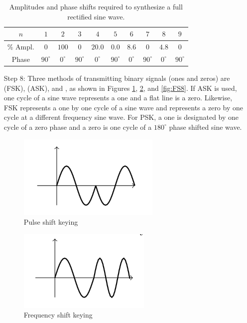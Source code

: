\documentclass[12pt, a4paper, oneside, openright, titlepage]{book}
\begin{document}
\begin{itemize}[leftmargin = 50pt]
        \begin{table}[H]
            \centering 
            \caption{Amplitudes and phase shifts required to synthesize a full rectified sine wave.}
            \begin{tabular}{|c|c|c|c|c|c|c|c|c|c|}
                \hline
                $n$ & $1$ & $2$ & $3$ & $4$ & $5$ & $6$ & $7$ & $8$ & $9$ \\ \hline
                \% Ampl. & $0$ & $100 $& $0$ & $20.0$ & $0.0$ & $8.6$ & $0$ & $4.8$ & $0$ \\ 
                Phase & $90^{\circ}$ & $0^{\circ}$ & $90^{\circ}$ & $0^{\circ}$ & $90^{\circ}$ & $0^{\circ}$ & $90^{\circ}$ & $0^{\circ}$ & $90^{\circ}$ \\ \hline
            \end{tabular}
            \label{tab:FS5}
        \end{table}
    \item[Step 8:] Three methods of transmitting binary signals (ones and zeros) are  (FSK),  (ASK), and , as shown in Figures \ref{fig:FS6}, \ref{fig:FS7}, and \ref{fig:FS8}. If ASK is used, one cycle of a sine wave represents a one and a flat line is a zero. Likewise, FSK represents a one by one cycle of a sine wave and represents a zero by one cycle at a different frequency sine wave. For PSK, a one is designated by one cycle of a zero phase and a zero is one cycle of a $180^{\circ}$ phase shifted sine wave.

        \begin{figure}[H]
    \centering
    \includegraphics[scale = 0.8]{Images/FS6.PNG}
    \caption{Pulse shift keying}
    \label{fig:FS6}
\end{figure}

\begin{figure}[H]
    \centering
    \includegraphics[scale = 0.8]{Images/FS7.PNG}
    \caption{Frequency shift keying}
    \label{fig:FS7}
\end{figure}


\end{itemize}
\end{document}
